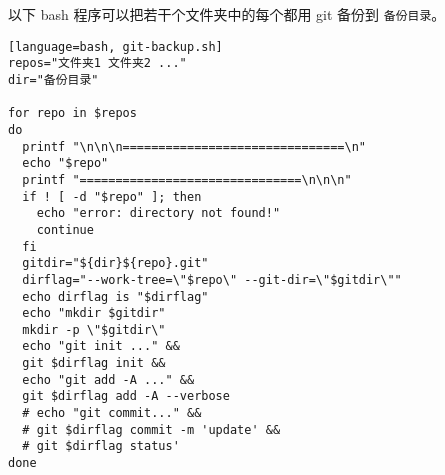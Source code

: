 
\begin{issues}
\issueDraft
\end{issues}

以下 bash 程序可以把若干个文件夹中的每个都用 git 备份到 \verb|备份目录|。

\begin{lstlisting}[language=bash, git-backup.sh]
repos="文件夹1 文件夹2 ..."
dir="备份目录"

for repo in $repos
do
  printf "\n\n\n===============================\n"
  echo "$repo"
  printf "===============================\n\n\n"
  if ! [ -d "$repo" ]; then
    echo "error: directory not found!"
    continue
  fi
  gitdir="${dir}${repo}.git"
  dirflag="--work-tree=\"$repo\" --git-dir=\"$gitdir\""
  echo dirflag is "$dirflag"
  echo "mkdir $gitdir"
  mkdir -p \"$gitdir\"
  echo "git init ..." &&
  git $dirflag init &&
  echo "git add -A ..." &&
  git $dirflag add -A --verbose
  # echo "git commit..." &&
  # git $dirflag commit -m 'update' &&
  # git $dirflag status'
done
\end{lstlisting}
